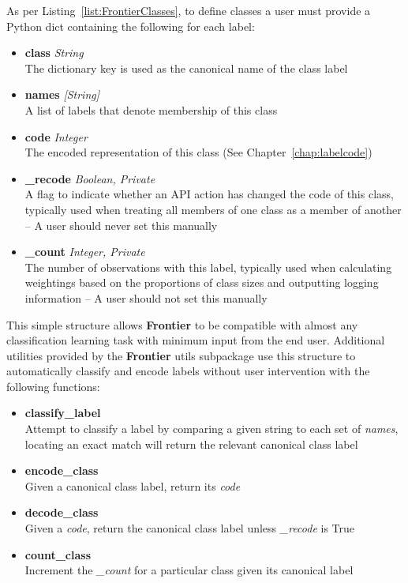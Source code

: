 As per Listing~\ref{list:FrontierClasses}, to define classes a user must provide
a Python dict containing the following for each label:

\begin{itemize}
    \item \textbf{class} \textit{String}\hfill\\
        The dictionary key is used as the canonical name of the class label
    \item \textbf{names} \textit{[String]}\hfill\\
        A list of labels that denote membership of this class
    \item \textbf{code} \textit{Integer}\hfill\\
        The encoded representation of this class (See Chapter~\ref{chap:labelcode})
    \item \textbf{\_recode} \textit{Boolean, Private}\hfill\\
        A flag to indicate whether an API action has changed the code of this
        class, typically used when treating all members of one class as a member
        of another -- A user should never set this manually
    \item \textbf{\_count} \textit{Integer, Private}\hfill\\
        The number of observations with this label, typically used when
        calculating weightings based on the proportions of class sizes and
        outputting logging information -- A user should not set this manually
\end{itemize}

This simple structure allows \textbf{Frontier} to be compatible with almost any
classification learning task with minimum input from the end user. Additional
utilities provided by the \textbf{Frontier} utils subpackage use this structure to
automatically classify and encode labels without user intervention with the
following functions:

\begin{itemize}
    \item \textbf{classify\_label} \hfill\\
        Attempt to classify a label by comparing a given string to each set of
        \textit{names}, locating an exact match will return the relevant
        canonical class label
    \item \textbf{encode\_class} \hfill\\
        Given a canonical class label, return its \textit{code}
    \item \textbf{decode\_class} \hfill\\
        Given a \textit{code}, return the canonical class label unless
        \textit{\_recode} is True
    \item \textbf{count\_class} \hfill\\
        Increment the \textit{\_count} for a particular class given its
        canonical label
\end{itemize}

